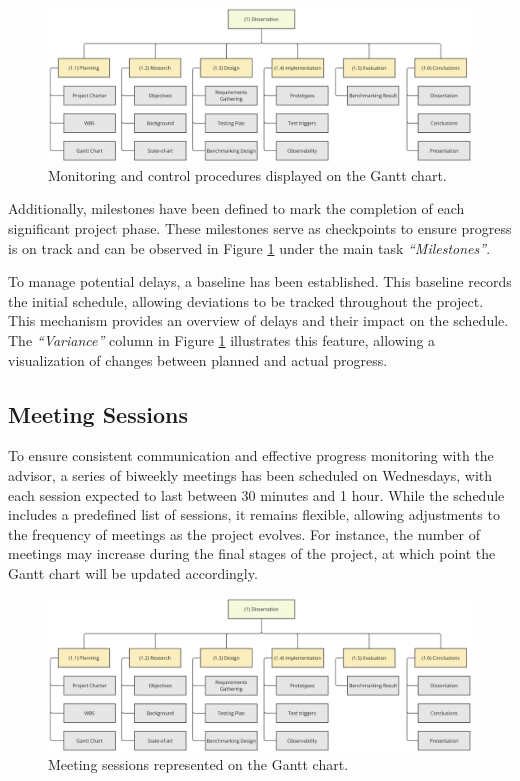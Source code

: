 \begin{figure}
      \centering
      \includegraphics[width=\linewidth]{ch-planning/assets/wbs.png}
      \caption{Monitoring and control procedures displayed on the Gantt chart.}
      \label{fig:gantt_monitoring}
\end{figure}

Additionally, milestones have been defined to mark the completion of each significant project phase. These milestones serve as checkpoints to ensure progress is on track and can be observed in Figure \ref{fig:gantt_monitoring} under the main task \textit{“Milestones”}.

To manage potential delays, a baseline has been established. This baseline records the initial schedule, allowing deviations to be tracked throughout the project. This mechanism provides an overview of delays and their impact on the schedule. The \textit{“Variance”} column in Figure \ref{fig:gantt_monitoring} illustrates this feature, allowing a visualization of changes between planned and actual progress.

\subsection{Meeting Sessions}

To ensure consistent communication and effective progress monitoring with the advisor, a series of biweekly meetings has been scheduled on Wednesdays, with each session expected to last between 30 minutes and 1 hour. While the schedule includes a predefined list of sessions, it remains flexible, allowing adjustments to the frequency of meetings as the project evolves. For instance, the number of meetings may increase during the final stages of the project, at which point the Gantt chart will be updated accordingly.

\begin{figure}
      \centering
      \includegraphics[width=\linewidth]{ch-planning/assets/wbs.png}
      \caption{Meeting sessions represented on the Gantt chart.}
      \label{fig:gantt_meetings}
\end{figure}

